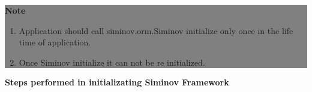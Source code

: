 		\begin{center}
			\colorbox{grey}{
				\parbox[t]{.8\linewidth}{
					\fontsize{11pt}{11pt}\selectfont %
					\vspace*{0.1cm} %
		
					\hfill \textbf{Note} \\

					\begin{enumerate}

						\item \small Application should call siminov.orm.Siminov initialize only once in the life time of application.

						\item \small Once Siminov initialize it can not be re initialized.

					\end{enumerate}

					\vspace*{0.0cm} %
				}
			}

		\end{center}


\par
\textbf{Steps performed in initializating Siminov Framework}

